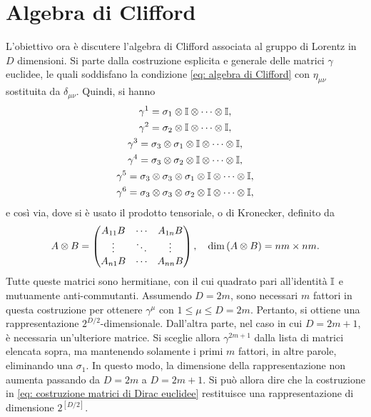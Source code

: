 \section{Algebra di Clifford}
L'obiettivo ora è discutere l'algebra di Clifford associata al gruppo di Lorentz in $D$ dimensioni. Si parte dalla costruzione esplicita e generale delle matrici $\gamma$ euclidee, le quali soddisfano la condizione \eqref{eq: algebra di Clifford} con $\eta_{\mu\nu}$ sostituita da $\delta_{\mu\nu}$. Quindi, si hanno
\begin{gather}
\label{eq: costruzione matrici di Dirac euclidee}
    \gamma^1 = \sigma_1 \otimes \mathbb{I} \otimes \cdots \otimes \mathbb{I}, \\
    \gamma^2 = \sigma_2 \otimes \mathbb{I} \otimes \cdots \otimes \mathbb{I}, \\
    \gamma^3 = \sigma_3 \otimes \sigma_1 \otimes \mathbb{I} \otimes \cdots \otimes \mathbb{I}, \\
    \gamma^4 = \sigma_3 \otimes \sigma_2 \otimes \mathbb{I} \otimes \cdots \otimes \mathbb{I}, \\
    \gamma^5 = \sigma_3 \otimes \sigma_3 \otimes \sigma_1 \otimes \mathbb{I} \otimes \cdots \otimes \mathbb{I}, \\
    \gamma^6 = \sigma_3 \otimes \sigma_3 \otimes \sigma_2 \otimes \mathbb{I} \otimes \cdots \otimes \mathbb{I}, 
\end{gather}
e così via, dove si è usato il prodotto tensoriale, o di Kronecker, definito da
\begin{equation}
    A \otimes B = 
    \begin{pmatrix}
        A_{11}B & \cdots & A_{1n}B \\
        \vdots & \ddots & \vdots \\
        A_{n1}B & \cdots & A_{nn}B
    \end{pmatrix},\quad \dim{(A \otimes B)} = nm \times nm.
\end{equation}
Tutte queste matrici sono hermitiane, con il cui quadrato pari all'identità $\mathbb{I}$ e mutuamente anti-commutanti. Assumendo $D = 2m$, sono necessari $m$ fattori in questa costruzione per ottenere $\gamma^\mu$ con $1 \le \mu \le D = 2m$. Pertanto, si ottiene una rappresentazione $2^{D/2}$-dimensionale. Dall'altra parte, nel caso in cui $D = 2m + 1$, è necessaria un'ulteriore matrice. Si sceglie allora $\gamma^{2m + 1}$ dalla lista di matrici elencata sopra, ma mantenendo solamente i primi $m$ fattori, in altre parole, eliminando una $\sigma_1$. In questo modo, la dimensione della rappresentazione non aumenta passando da $D = 2m$ a $D = 2m + 1$. Si può allora dire che la costruzione in \eqref{eq: costruzione matrici di Dirac euclidee} restituisce una rappresentazione di dimensione $2^{[D/2]}$. 

